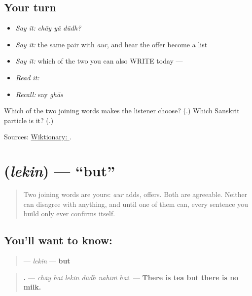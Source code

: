\subsection*{Your turn}
\begin{itemize}
\raggedright
  \item \emph{Say it:} \emph{chāy yā dūdh?}
  \item \emph{Say it:} the same pair with \emph{aur}, and hear the offer become a list
  \item \emph{Say it:} which of the two you can also WRITE today — \textbf{}
  \item \emph{Read it:} \textbf{}
  \item \emph{Recall:} say \emph{ghās}
\end{itemize}

\begin{tcolorbox}[breakable,colback=teal!4,colframe=teal!35!black,title={Before you move on}]
Which of the two joining words makes the listener choose? (\textbf{}.) Which Sanskrit particle is it? (\textbf{}.)

Sources: \href{https://en.wiktionary.org/wiki/\%E0\%A4\%AF\%E0\%A4\%BE}{Wiktionary: }.
\end{tcolorbox}
\section[\texorpdfstring{\hi{लेकिन} (lekin)}{लेकिन (lekin)}]{ (\emph{lekin}) — \textquotedblleft{}but\textquotedblright{}}

\label{lesson:HI-C68-lekin}



\begin{quote}
Two joining words are yours: \emph{aur} adds, \textbf{} offers. Both are agreeable. Neither can disagree with anything, and until one of them can, every sentence you build only ever confirms itself.
\end{quote}

\subsection*{You'll want to know: }
\begin{quote}
\textbf{} — \emph{lekin} — \textbf{but}
\end{quote}

\begin{quote}
\textbf{     .} — \emph{chāy hai lekin dūdh nahīṁ hai.} — \textbf{There is tea but there is no milk.}
\end{quote}

